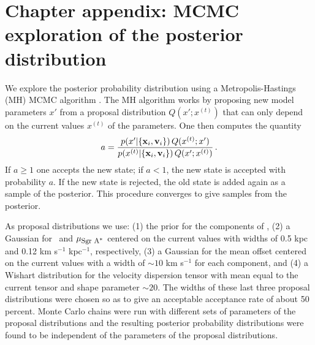 \section{Chapter appendix: MCMC exploration of the posterior distribution}\label{sec:masersappendix}

We explore the posterior probability distribution using a
Metropolis-Hastings (MH) MCMC algorithm \citep[\eg,][]{mackay}. The MH
algorithm works by proposing new model parameters $x'$ from a proposal
distribution $Q(x';x^{(t)})$ that can only depend on the current
values $x^{(t)}$ of the parameters. One then computes the quantity
\begin{equation}
a =
\frac{p(x'|\{\boldsymbol{\mathbf{x}}_i,\boldsymbol{\mathbf{v}}_i\})\,Q(x^{(t)};x')}{p(x^{(t)}|\{\boldsymbol{\mathbf{x}}_i,\boldsymbol{\mathbf{v}}_i\})\,Q(x';x^{(t)})}\,.
\end{equation}
If $a \geq 1$ one accepts the new state; if $a < 1$, the new state is
accepted with probability $a$. If the new state is rejected, the old
state is added again as a sample of the posterior. This procedure
converges to give samples from the posterior.

As proposal distributions we use: (1) the prior for the components of
\vsunlsr, (2) a Gaussian for \Ro\ and $\mu_{\mbox{{\footnotesize Sgr A$^*$}}}$ centered on the
current values with widths of 0.5 kpc and 0.12 km s$^{-1}$ kpc$^{-1}$,
respectively, (3) a Gaussian for the mean offset centered on the
current values with a width of $\sim\!10$ km s$^{-1}$ for each
component, and (4) a Wishart distribution for the velocity dispersion
tensor with mean equal to the current tensor and shape parameter
$\sim\!20$. The widths of these last three proposal distributions were
chosen so as to give an acceptable acceptance rate of about
50\,percent. Monte Carlo chains were run with different sets of
parameters of the proposal distributions and the resulting posterior
probability distributions were found to be independent of the
parameters of the proposal distributions.



